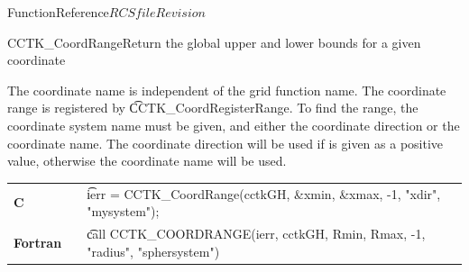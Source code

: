 \begin{cactuspart}{FunctionReference}{$RCSfile$}{$Revision$}
\begin{CCTKFunc}{CCTK\_CoordRange}{Return the global upper and lower bounds for a given coordinate}
\label{CCTK-CoordRange}
\showargs
\begin{params}
\end{params}
\begin{discussion}
The coordinate name is independent of the grid function name.
The coordinate range is registered by {\t CCTK\_CoordRegisterRange}.
To find the range, the coordinate system name must be given, and either
the coordinate direction or the coordinate name. The coordinate direction
will be used if is given as a positive value, otherwise the coordinate
name will be used.
\end{discussion}
\begin{examples}
\begin{tabular}{@{}p{3cm}cp{11cm}}
\hfill {\bf C} && {\t ierr = CCTK\_CoordRange(cctkGH, \&xmin, \&xmax, -1, "xdir", "mysystem");}
\\
\hfill {\bf Fortran} && {\t call CCTK\_COORDRANGE(ierr, cctkGH, Rmin, Rmax, -1, "radius", "sphersystem")}
\\
\end{tabular}
\end{examples}
\begin{errorcodes}
\end{errorcodes}
\end{CCTKFunc}


\end{cactuspart}
